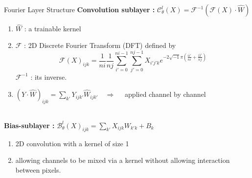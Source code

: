 \documentclass[compress,10pt,xcolor={table,dvipsnames},t]{beamer}
\begin{document}
	\begin{frame}{Fourier Layer Structure}
		\textbf{Convolution sublayer : } \quad $\mathcal{C}_\theta^l(X)=\mathcal{F}^{-1}(\mathcal{F}(X)\cdot\hat{W})$ \quad
		\begin{minipage}{0.3\linewidth}
			\vspace{-15pt}
			\centering
		\end{minipage}
		\begin{enumerate}[\ding{217}]
			\item $\hat{W}$ : a trainable kernel
			\item $\mathcal{F}$ : 2D Discrete Fourier Transform (DFT) defined by
			\begin{equation*}
				\mathcal{F}(X)_{ijk}=\frac{1}{ni}\frac{1}{nj}\sum_{i'=0}^{ni-1}\sum_{j'=0}^{nj-1}X_{i'j'k}e^{-2\sqrt{-1}\pi\left(\frac{ii'}{ni}+\frac{jj'}{nj}\right)}
			\end{equation*}
			$\mathcal{F}^{-1}$ : its inverse.
			\item $(Y\cdot\hat{W})_{ijk}=\sum_{k'}Y_{ijk'}\hat{W}_{ijk'} \quad \Rightarrow \quad$ applied channel by channel
		\end{enumerate} \; \\
		\textbf{Bias-sublayer :} \quad  $\mathcal{B}_\theta^l(X)_{ijk}=\sum_{k'}X_{ijk}W_{k'k}+B_k$ \quad
		\begin{minipage}{0.3\linewidth}
			\vspace{-10pt}
		\end{minipage}
		\begin{enumerate}[\ding{217}]
			\item 2D convolution with a kernel of size 1
			\item allowing channels to be mixed via a kernel without allowing interaction between pixels.
		\end{enumerate}
	\end{frame}
\end{document}
